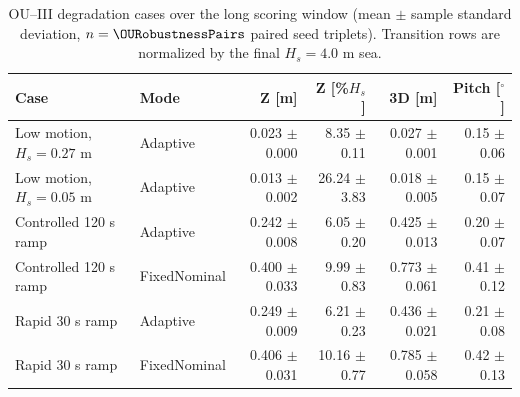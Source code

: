 \begin{table}[t]
  \centering
  \caption{OU--III degradation cases over the long scoring window (mean $\pm$ sample standard deviation, $n=\OURobustnessPairs$ paired seed triplets). Transition rows are normalized by the final $H_s=4.0$ m sea.}
  \label{tab:ou_robustness_stress}
  \footnotesize
  \setlength{\tabcolsep}{5pt}
  \begin{tabular}{@{}llrrrr@{}}
    \toprule
    Case & Mode & Z [m] & Z [\%$H_s$] & 3D [m] & Pitch [$^\circ$] \\
    \midrule
    Low motion, $H_s=0.27$ m & Adaptive & 0.023 $\pm$ 0.000 & 8.35 $\pm$ 0.11 & 0.027 $\pm$ 0.001 & 0.15 $\pm$ 0.06 \\
    Low motion, $H_s=0.05$ m & Adaptive & 0.013 $\pm$ 0.002 & 26.24 $\pm$ 3.83 & 0.018 $\pm$ 0.005 & 0.15 $\pm$ 0.07 \\
    Controlled 120 s ramp & Adaptive & 0.242 $\pm$ 0.008 & 6.05 $\pm$ 0.20 & 0.425 $\pm$ 0.013 & 0.20 $\pm$ 0.07 \\
    Controlled 120 s ramp & FixedNominal & 0.400 $\pm$ 0.033 & 9.99 $\pm$ 0.83 & 0.773 $\pm$ 0.061 & 0.41 $\pm$ 0.12 \\
    Rapid 30 s ramp & Adaptive & 0.249 $\pm$ 0.009 & 6.21 $\pm$ 0.23 & 0.436 $\pm$ 0.021 & 0.21 $\pm$ 0.08 \\
    Rapid 30 s ramp & FixedNominal & 0.406 $\pm$ 0.031 & 10.16 $\pm$ 0.77 & 0.785 $\pm$ 0.058 & 0.42 $\pm$ 0.13 \\
    \bottomrule
  \end{tabular}
\end{table}
